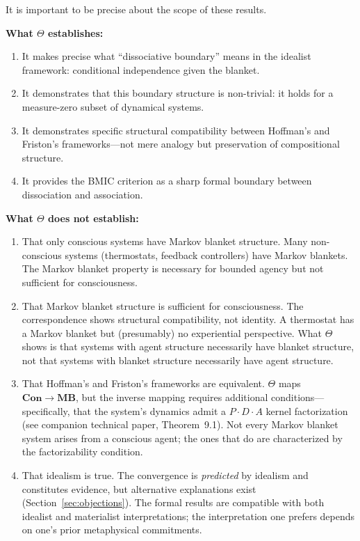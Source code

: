\documentclass[11pt,a4paper]{article}
\theoremstyle{definition}
\theoremstyle{plain}
\theoremstyle{remark}
\newcommand{\Con}{\mathbf{Con}}
\newcommand{\MB}{\mathbf{MB}}
\begin{document}
It is important to be precise about the scope of these results.

\textbf{What $\Theta$ establishes:}
\begin{enumerate}
    \item It makes precise what ``dissociative boundary'' means in the idealist framework: conditional independence given the blanket.
    \item It demonstrates that this boundary structure is non-trivial: it holds for a measure-zero subset of dynamical systems.
    \item It demonstrates specific structural compatibility between Hoffman's and Friston's frameworks---not mere analogy but preservation of compositional structure.
    \item It provides the BMIC criterion as a sharp formal boundary between dissociation and association.
\end{enumerate}

\textbf{What $\Theta$ does not establish:}
\begin{enumerate}
    \item That only conscious systems have Markov blanket structure. Many non-conscious systems (thermostats, feedback controllers) have Markov blankets. The Markov blanket property is necessary for bounded agency but not sufficient for consciousness.
    \item That Markov blanket structure is sufficient for consciousness. The correspondence shows structural compatibility, not identity. A thermostat has a Markov blanket but (presumably) no experiential perspective. What $\Theta$ shows is that systems with agent structure necessarily have blanket structure, not that systems with blanket structure necessarily have agent structure.
    \item That Hoffman's and Friston's frameworks are equivalent. $\Theta$ maps $\Con \to \MB$, but the inverse mapping requires additional conditions---specifically, that the system's dynamics admit a $P \cdot D \cdot A$ kernel factorization (see companion technical paper, Theorem~9.1). Not every Markov blanket system arises from a conscious agent; the ones that do are characterized by the factorizability condition.
    \item That idealism is true. The convergence is \textit{predicted} by idealism and constitutes evidence, but alternative explanations exist (Section~\ref{sec:objections}). The formal results are compatible with both idealist and materialist interpretations; the interpretation one prefers depends on one's prior metaphysical commitments.
\end{enumerate}
\end{document}
